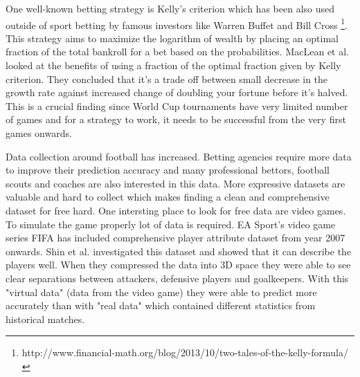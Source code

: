 One well-known betting strategy is Kelly's criterion which has been also used outside of sport betting by famous investors like Warren Buffet and Bill Cross \footnote{http://www.financial-math.org/blog/2013/10/two-tales-of-the-kelly-formula/}. This strategy aims to maximize the logarithm of wealth by placing an optimal fraction of the total bankroll for a bet based on the probabilities. MacLean et al. \cite{maclean1992growth} looked at the benefits of using a fraction of the optimal fraction given by Kelly criterion. They concluded that it's a trade off between small decrease in the growth rate against increased change of doubling your fortune before it's halved. This is a crucial finding since World Cup tournaments have very limited number of games and for a strategy to work, it needs to be successful from the very first games onwards.

Data collection around football has increased. Betting agencies require more data to improve their prediction accuracy and many professional bettors, football scouts and coaches are also interested in this data. More expressive datasets are valuable and hard to collect which makes finding a clean and comprehensive dataset for free hard. One intersting place to look for free data are video games. To simulate the game properly lot of data is required. EA Sport's video game series FIFA has included comprehensive player attribute dataset from year 2007 onwards. Shin et al. \cite{shin2014novel} investigated this dataset and showed that it can describe the players well. When they compressed the data into 3D space they were able to see clear separations between attackers, defensive players and goalkeepers. With this "virtual data" (data from the video game) they were able to predict more accurately than with "real data" which contained different statistics from historical matches.



